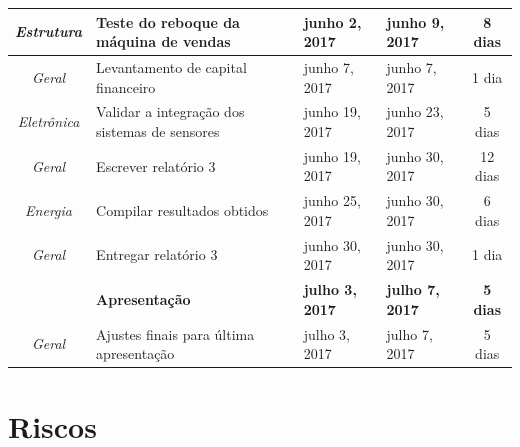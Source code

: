 \begin{longtable}{|c|m{6.5cm}|m{3.2cm}|m{3.2cm}|c|}
\textit{Estrutura}                                                        & Teste do reboque da máquina de vendas                        & junho 2, 2017                        & junho 9, 2017                     & 8 dias                                \\ \hline
\textit{Geral}                                                            & Levantamento de capital financeiro                   & junho 7, 2017                        & junho 7, 2017                     & 1 dia                                 \\ \hline
\textit{Eletrônica}                                                       & Validar a integração dos sistemas de sensores        & junho 19, 2017                       & junho 23, 2017                    & 5 dias                                \\ \hline
\textit{Geral}                                                            & Escrever relatório 3                                 & junho 19, 2017                       & junho 30, 2017                    & 12 dias                               \\ \hline
\textit{Energia}                                                          & Compilar resultados obtidos                          & junho 25, 2017                       & junho 30, 2017                    & 6 dias                                \\ \hline
\textit{Geral}                                                            & Entregar relatório 3                                 & junho 30, 2017                       & junho 30, 2017                    & 1 dia                                 \\ \hline
\textit{\textbf{}}                                                        & \textbf{Apresentação}                                & \textbf{julho 3, 2017}               & \textbf{julho 7, 2017}            & \textbf{5 dias}                       \\ \hline
\textit{Geral}                                                            & Ajustes finais para última apresentação              & julho 3, 2017                        & julho 7, 2017                     & 5 dias                                \\ \hline
\end{longtable}


\section{Riscos}

